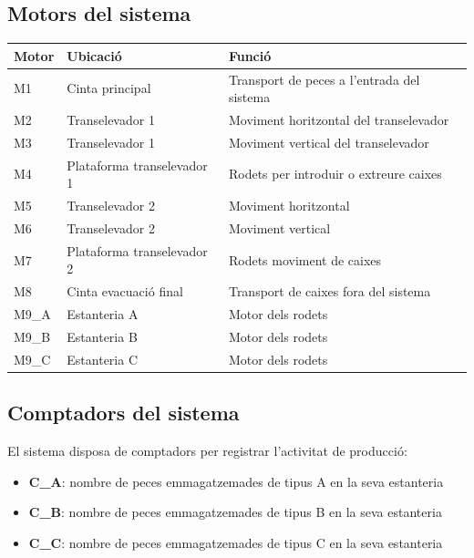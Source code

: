 \documentclass[12pt,a4paper]{report}
\begin{document}
\subsection{Motors del sistema}

\begin{table}[H]
\centering
\small
\begin{tabular}{|p{3cm}|p{5cm}|p{6cm}|}
\hline
\textbf{Motor} & \textbf{Ubicació} & \textbf{Funció} \\ \hline

M1 & Cinta principal & Transport de peces a l'entrada del sistema \\ \hline
M2 & Transelevador 1 & Moviment horitzontal del transelevador \\ \hline
M3 & Transelevador 1 & Moviment vertical del transelevador \\ \hline
M4 & Plataforma transelevador 1 & Rodets per introduir o extreure caixes \\ \hline
M5 & Transelevador 2 & Moviment horitzontal \\ \hline
M6 & Transelevador 2 & Moviment vertical \\ \hline
M7 & Plataforma transelevador 2 & Rodets moviment de caixes \\ \hline
M8 & Cinta evacuació final & Transport de caixes fora del sistema \\ \hline
M9\_A & Estanteria A & Motor dels rodets \\ \hline
M9\_B & Estanteria B & Motor dels rodets \\ \hline
M9\_C & Estanteria C & Motor dels rodets \\ \hline


\end{tabular}
\end{table}
\subsection{Comptadors del sistema}

El sistema disposa de comptadors per registrar l'activitat de producció:

\begin{itemize}
\item \textbf{C\_A}: nombre de peces emmagatzemades de tipus A en la seva estanteria
\item \textbf{C\_B}: nombre de peces emmagatzemades de tipus B en la seva estanteria
\item \textbf{C\_C}: nombre de peces emmagatzemades de tipus C en la seva estanteria
\end{itemize}
\end{document}
